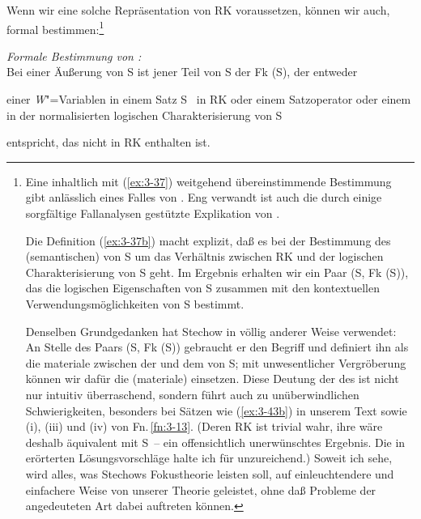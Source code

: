 \documentclass[output=paper]{langsci/langscibook}
\begin{document}
Wenn wir eine solche Repräsentation von RK voraussetzen, können wir  auch, formal bestimmen:\footnote{\label{fn:3-10}%
	Eine inhaltlich mit (\ref{ex:3-37}) weitgehend übereinstimmende Bestimmung gibt \citet[192f]{Kempson75} anlässlich eines Falles von . Eng verwandt ist auch die durch einige sorgfältige Fallanalysen gestützte Explikation von \citet{Pasch78a}.

  Die Definition (\ref{ex:3-37b}) macht explizit, daß es bei der Bestimmung des
  (semantischen)  von S um das Verhältnis zwischen RK und der
  logischen Charakterisierung von S geht. Im Ergebnis erhalten wir
  ein Paar (S, Fk (S)), das die logischen Eigenschaften von S
  zusammen mit den kontextuellen Verwendungsmöglichkeiten von S
  bestimmt. 

  Denselben Grundgedanken hat Stechow \citep{Stechow80a,Stechow80b} in völlig anderer Weise verwendet: An Stelle des Paars (S, Fk (S)) gebraucht er den Begriff  und definiert ihn als die materiale  zwischen der  und dem  von S; mit unwesentlicher Vergröberung können wir dafür die (materiale)   einsetzen. Diese Deutung der  des  ist nicht nur intuitiv überraschend, sondern führt auch zu unüberwindlichen Schwierigkeiten, besonders bei Sätzen wie (\ref{ex:3-43b}) in unserem Text sowie (i), (iii) und (iv) von Fn.\,\ref{fn:3-13}. (Deren RK ist trivial wahr, ihre  wäre deshalb äquivalent mit S~-- ein offensichtlich unerwünschtes Ergebnis. Die in \citet{Stechow80b} erörterten Lösungsvorschläge halte ich für unzureichend.) Soweit ich
  sehe, wird alles, was Stechows Fokustheorie leisten soll, auf
  einleuchtendere und einfachere Weise von unserer Theorie geleistet,
  ohne daß Probleme der angedeuteten Art dabei auftreten können.%
}
\begin{exe}
\ex
\label{ex:3-37}
\textit{Formale Bestimmung von :} \\
Bei einer Äußerung von S ist jener Teil von S der Fk (S), der entweder
\begin{xlist}
\ex
\label{ex:3-37a}
einer \textit{W}"=Variablen in einem Satz S \ in RK oder
\ex
\label{ex:3-37b}
einem Satzoperator oder einem  in der normalisierten logischen
Charakterisierung von S
\end{xlist}
entspricht, das nicht in RK enthalten ist.
\end{exe}
\end{document}
